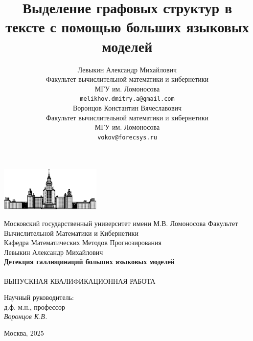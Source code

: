 \documentclass[12pt]{article}
\title{Выделение графовых структур в тексте с помощью больших языковых моделей}
\author{ Левыкин Александр Михайлович \\
        Факультет вычислительной математики и кибернетики \\
        МГУ им. Ломоносова \\
        \texttt{melikhov.dmitry.a@gmail.com} \\
	\And
	Воронцов Константин Вячеславович \\
        Факультет вычислительной математики и кибернетики \\
        МГУ им. Ломоносова \\
        \texttt{vokov@forecsys.ru} \\
}
\date{}
\begin{document}
\begin{titlepage}
\begin{center}
    

    \bigskip
    \includegraphics[width=50mm]{msu.eps}

    \bigskip
    Московский государственный университет имени М.В. Ломоносова
    Факультет Вычислительной Математики и Кибернетики \\
    Кафедра Математических Методов Прогнозирования \\
    \bigskip
    \bigskip
    \bigskip
    \bigskip
    \bigskip
    {\large Левыкин Александр Михайлович} \\
    \bigskip
    \bigskip
    \textsf{\Large\bfseries
        Детекция галлюцинаций больших языковых моделей \\[10mm]
    }\\[10mm]
    ВЫПУСКНАЯ КВАЛИФИКАЦИОННАЯ РАБОТА \\[50mm]
    \begin{flushright}
        \parbox{0.3\textwidth}{
            Научный руководитель:\\
            д.ф.-м.н., профессор\\
            \emph{Воронцов К.В.}
        }
    \end{flushright}


    \vspace{\fill}
    Москва, 2025
\end{center}
\end{titlepage}
\end{document}
